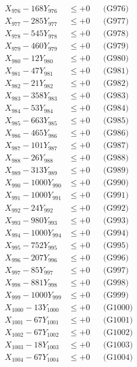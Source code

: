 \documentclass[a4paper,10pt]{article}
\begin{document}
{\begin{align}
X_{976} - 168Y_{976} &\leq +0 && \text{(G976)} \\
X_{977} - 285Y_{977} &\leq +0 && \text{(G977)} \\
X_{978} - 545Y_{978} &\leq +0 && \text{(G978)} \\
X_{979} - 460Y_{979} &\leq +0 && \text{(G979)} \\
X_{980} - 12Y_{980} &\leq +0 && \text{(G980)} \\
\allowbreak
X_{981} - 47Y_{981} &\leq +0 && \text{(G981)} \\
X_{982} - 21Y_{982} &\leq +0 && \text{(G982)} \\
X_{983} - 358Y_{983} &\leq +0 && \text{(G983)} \\
X_{984} - 53Y_{984} &\leq +0 && \text{(G984)} \\
X_{985} - 663Y_{985} &\leq +0 && \text{(G985)} \\
X_{986} - 465Y_{986} &\leq +0 && \text{(G986)} \\
X_{987} - 101Y_{987} &\leq +0 && \text{(G987)} \\
X_{988} - 26Y_{988} &\leq +0 && \text{(G988)} \\
X_{989} - 313Y_{989} &\leq +0 && \text{(G989)} \\
X_{990} - 1000Y_{990} &\leq +0 && \text{(G990)} \\
\allowbreak
X_{991} - 1000Y_{991} &\leq +0 && \text{(G991)} \\
X_{992} - 24Y_{992} &\leq +0 && \text{(G992)} \\
X_{993} - 980Y_{993} &\leq +0 && \text{(G993)} \\
X_{994} - 1000Y_{994} &\leq +0 && \text{(G994)} \\
X_{995} - 752Y_{995} &\leq +0 && \text{(G995)} \\
X_{996} - 207Y_{996} &\leq +0 && \text{(G996)} \\
X_{997} - 85Y_{997} &\leq +0 && \text{(G997)} \\
X_{998} - 881Y_{998} &\leq +0 && \text{(G998)} \\
X_{999} - 1000Y_{999} &\leq +0 && \text{(G999)} \\
X_{1000} - 13Y_{1000} &\leq +0 && \text{(G1000)} \\
\allowbreak
X_{1001} - 67Y_{1001} &\leq +0 && \text{(G1001)} \\
X_{1002} - 67Y_{1002} &\leq +0 && \text{(G1002)} \\
X_{1003} - 18Y_{1003} &\leq +0 && \text{(G1003)} \\
X_{1004} - 67Y_{1004} &\leq +0 && \text{(G1004)} \\

\end{align}}
\end{document}
